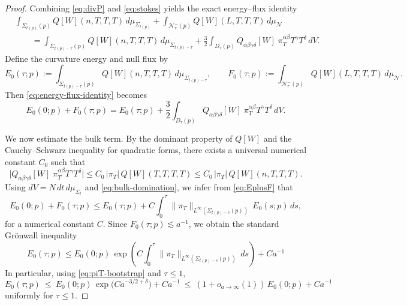 \documentclass{amsart}
\begin{document}
{\begin{proof}
\noindent Combining \eqref{eq:divP} and \eqref{eq:stokes} yields the exact energy--flux identity
\begin{align}
\label{eq:energy-flux-identity}
&\int_{\Sigma_{t(p)}(p)} Q[W](n,T,T,T)\,d\mu_{\Sigma_{t(p)}}
+\int_{\mathcal{N}^{-}_{\tau}(p)} Q[W](L,T,T,T)\,d\mu_{\mathcal{N}}
\nonumber\\
&\qquad =
\int_{\Sigma_{t(p)-\tau}(p)} Q[W](n,T,T,T)\,d\mu_{\Sigma_{t(p)-\tau}}
+\frac{3}{2}\int_{D_{\tau}(p)}
Q_{\alpha\beta\gamma\delta}[W]\;\pi_{T}^{\alpha\beta}T^{\gamma}T^{\delta}\,dV.
\end{align}
Define the curvature energy and null flux by
\[
E_{0}(\tau;p):=\int_{\Sigma_{t(p)-\tau}(p)} Q[W](n,T,T,T)\,d\mu_{\Sigma_{t(p)-\tau}},\qquad
F_{0}(\tau;p):=\int_{\mathcal{N}^{-}_{\tau}(p)} Q[W](L,T,T,T)\,d\mu_{\mathcal{N}}.
\]
Then \eqref{eq:energy-flux-identity} becomes
\begin{equation}
\label{eq:EplusF}
E_{0}(0;p)+F_{0}(\tau;p)
=
E_{0}(\tau;p)
+\frac{3}{2}\int_{D_{\tau}(p)}
Q_{\alpha\beta\gamma\delta}[W]\;\pi_{T}^{\alpha\beta}T^{\gamma}T^{\delta}\,dV.
\end{equation}

\medskip

\noindent
We now estimate the bulk term.  By the dominant property of $Q[W]$ and the Cauchy--Schwarz inequality for
quadratic forms, there exists a universal numerical constant $C_{0}$ such that
\begin{equation}
\label{eq:bulk-domination}
\big|Q_{\alpha\beta\gamma\delta}[W]\;\pi_{T}^{\alpha\beta}T^{\gamma}T^{\delta}\big|
\le
C_{0}\,|\pi_{T}|\,Q[W](T,T,T,T)
\le
C_{0}\,|\pi_{T}|\,Q[W](n,T,T,T).
\end{equation}
Using $dV=N\,dt\,d\mu_{\Sigma_{t}}$ and \eqref{eq:bulk-domination}, we infer from \eqref{eq:EplusF} that
\begin{equation}
\label{eq:energy-ineq-pre}
E_{0}(0;p)+F_{0}(\tau;p)
\le
E_{0}(\tau;p)
+
C\int_{0}^{\tau}
\|\pi_{T}\|_{L^{\infty}(\Sigma_{t(p)-s}(p))}\,E_{0}(s;p)\,ds,
\end{equation}
for a numerical constant $C$.  Since $F_{0}(\tau;p)\lesssim  a^{-1}$, we obtain the standard Gr\"onwall inequality
\begin{equation}
\label{eq:gronwall}
E_{0}(\tau;p)
\le
E_{0}(0;p)\,
\exp\!\left(
C\int_{0}^{\tau}
\|\pi_{T}\|_{L^{\infty}(\Sigma_{t(p)-s}(p))}\,ds
\right)+Ca^{-1}
\end{equation}
In particular, using \eqref{eq:piT-bootstrap} and $\tau\le 1$,
\begin{equation}
\label{eq:E0-control}
E_{0}(\tau;p)\ \le\ E_{0}(0;p)\,\exp\!\big(Ca^{-3/2+\delta}\big)+Ca^{-1}
\ \le\ (1+o_{a\to\infty}(1))\,E_{0}(0;p)+Ca^{-1}
\end{equation}
uniformly for $\tau\le 1$.


\end{proof}}
\end{document}
